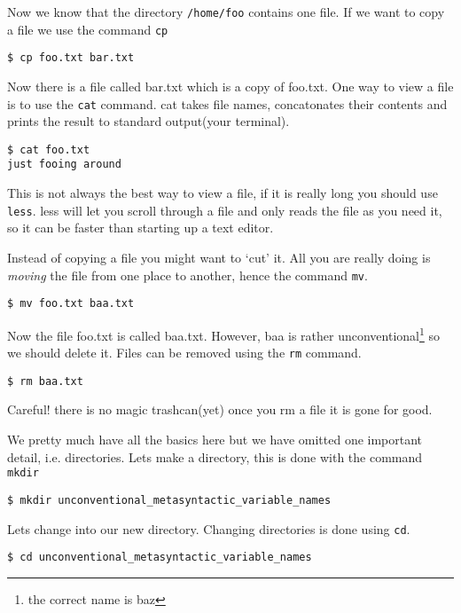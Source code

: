 \documentclass[10pt]{article}
\begin{document}
  Now we know that the directory \texttt{/home/foo} contains one file.
  If we want to copy a file we use the command \texttt{cp}

\begin{verbatim}
$ cp foo.txt bar.txt
\end{verbatim}

  Now there is a file called bar.txt which is a copy of foo.txt. One way to view a file
  is to use the \texttt{cat} command. cat takes file names, concatonates their contents and prints
  the result to standard output(your terminal).

\begin{verbatim}
$ cat foo.txt 
just fooing around
\end{verbatim}
  
  This is not always the best way to view a file, if it is really long you should use \texttt{less}.
  less will let you scroll through a file and only reads the file as you need it, so it can be faster than starting up a text editor.
  
  Instead of copying a file you might want to `cut' it. All you are really doing is \textit{moving} the file from one place to another, hence the command \texttt{mv}.
\begin{verbatim}
$ mv foo.txt baa.txt
\end{verbatim}

  Now the file foo.txt is called baa.txt. However, baa is rather unconventional\footnote{the correct name is baz} so we should delete it.
  Files can be removed using the \texttt{rm} command.

\begin{verbatim}
$ rm baa.txt
\end{verbatim}
  
  Careful! there is no magic trashcan(yet) once you rm a file it is gone for good.

  We pretty much have all the basics here but we have omitted one important detail, i.e. directories.
  Lets make a directory, this is done with the command \texttt{mkdir}

\begin{verbatim}
$ mkdir unconventional_metasyntactic_variable_names
\end{verbatim}
  
  Lets change into our new directory. Changing directories is done using \texttt{cd}.

\begin{verbatim}
$ cd unconventional_metasyntactic_variable_names
\end{verbatim}
  
\end{document}
